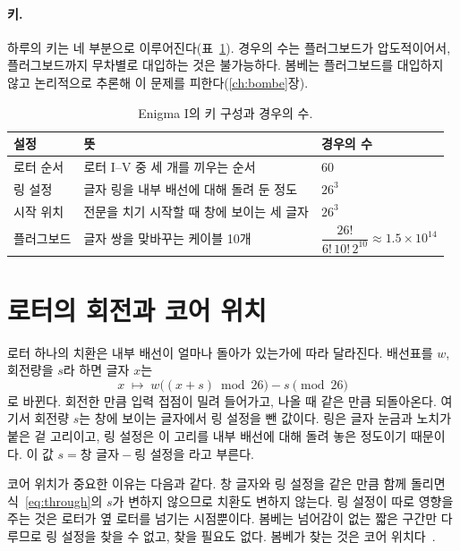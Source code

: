 \paragraph{키.} 하루의 키는 네 부분으로 이루어진다(표~\ref{tab:keyspace}). 경우의 수는 플러그보드가
압도적이어서, 플러그보드까지 무차별로 대입하는 것은 불가능하다. 봄베는 플러그보드를 대입하지 않고
논리적으로 추론해 이 문제를 피한다(\ref{ch:bombe}장).

\begin{table}[ht]
\centering
\caption{Enigma I의 키 구성과 경우의 수.}
\label{tab:keyspace}
\begin{tabular}{lll}
\toprule
설정 & 뜻 & 경우의 수 \\
\midrule
로터 순서 & 로터 I--V 중 세 개를 끼우는 순서 & 60 \\
링 설정 & 글자 링을 내부 배선에 대해 돌려 둔 정도 & $26^3$ \\
시작 위치 & 전문을 치기 시작할 때 창에 보이는 세 글자 & $26^3$ \\
플러그보드 & 글자 쌍을 맞바꾸는 케이블 10개 & $\dfrac{26!}{6!\,10!\,2^{10}} \approx 1.5\times10^{14}$ \\
\bottomrule
\end{tabular}
\end{table}

\section{로터의 회전과 코어 위치}

로터 하나의 치환은 내부 배선이 얼마나 돌아가 있는가에 따라 달라진다. 배선표를 $w$, 회전량을 $s$라 하면
글자 $x$는
\begin{equation}
  x \;\mapsto\; w\bigl((x+s) \bmod 26\bigr) - s \pmod{26} \label{eq:through}
\end{equation}
로 바뀐다. 회전한 만큼 입력 접점이 밀려 들어가고, 나올 때 같은 만큼 되돌아온다.
여기서 회전량 $s$는 창에 보이는 글자에서 링 설정을 뺀 값이다. 링은 글자 눈금과 노치가 붙은 겉 고리이고,
링 설정은 이 고리를 내부 배선에 대해 돌려 놓은 정도이기 때문이다. 이 값
$s = \text{창 글자} - \text{링 설정}$을 라고 부른다.

코어 위치가 중요한 이유는 다음과 같다. 창 글자와 링 설정을 같은 만큼 함께 돌리면 식~\eqref{eq:through}의
$s$가 변하지 않으므로 치환도 변하지 않는다. 링 설정이 따로 영향을 주는 것은 로터가 옆 로터를 넘기는
시점뿐이다. 봄베는 넘어감이 없는 짧은 구간만 다루므로 링 설정을 찾을 수 없고, 찾을 필요도 없다.
봄베가 찾는 것은 코어 위치다~\cite[4]{us6812report1944}.

